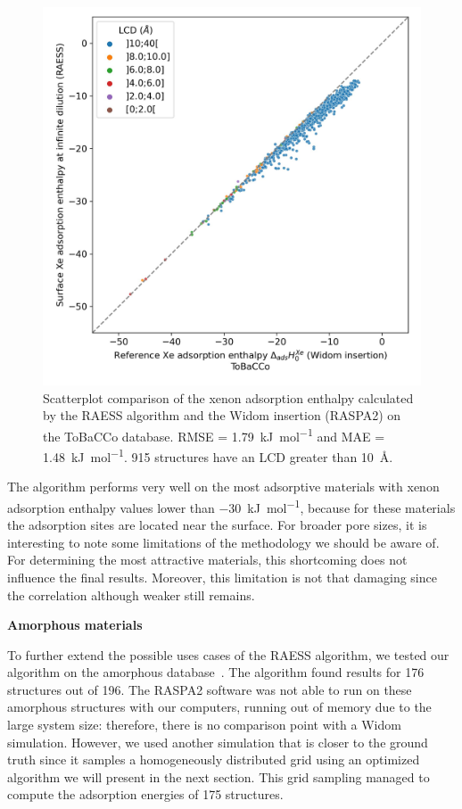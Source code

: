 \documentclass[main]{subfiles}
\begin{document}
\begin{figure}[ht]
\centering
  \includegraphics[width=0.5\linewidth]{figures/3-fastsim/H_Xe_0_widom_vs_Enthalpy_surface_kjmol_overview_tobacco.jpeg}
  \caption{Scatterplot comparison of the xenon adsorption enthalpy calculated by the RAESS algorithm and the Widom insertion (RASPA2) on the ToBaCCo database. RMSE = \SI{1.79}{\kilo\joule\per\mole} and MAE = \SI{1.48}{\kilo\joule\per\mole}. 915 structures have an LCD greater than \SI{10}{\angstrom}.}\label{fgr:tobacco}
\end{figure}

The algorithm performs very well on the most adsorptive materials with xenon adsorption enthalpy values lower than \SI{-30}{\kilo\joule\per\mole}, because for these materials the adsorption sites are located near the surface. For broader pore sizes, it is interesting to note some limitations of the methodology we should be aware of. For determining the most attractive materials, this shortcoming does not influence the final results. Moreover, this limitation is not that damaging since the correlation although weaker still remains.


\textbf{Amorphous materials}

To further extend the possible uses cases of the RAESS algorithm, we tested our algorithm on the amorphous database~\autocite{Thyagarajan_2020}. The algorithm found results for 176 structures out of 196. The RASPA2 software was not able to run on these amorphous structures with our computers, running out of memory due to the large system size: therefore, there is no comparison point with a Widom simulation. However, we used another simulation that is closer to the ground truth since it samples a homogeneously distributed grid using an optimized algorithm we will present in the next section. This grid sampling managed to compute the adsorption energies of 175 structures. 
\end{document}
